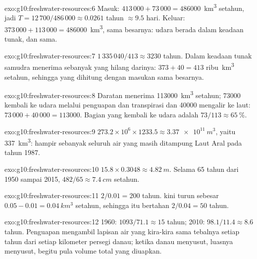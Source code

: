 \begin{solution}{exo:g10:freshwater-resources:6}
Masuk: $413\,000 + 73\,000 = \num{486000}$~\unit{km^3} setahun, jadi
$T = 12\,700/486\,000 \approx \num{0.0261}$ tahun $\approx \num{9.5}$ hari.
Keluar: $373\,000 + 113\,000 = \num{486000}$~\unit{km^3}, sama besarnya: udara
berada dalam keadaan tunak, dan  sama.
\end{solution}

\begin{solution}{exo:g10:freshwater-resources:7}
$1\,335\,040/413 \approx \num{3230}$ tahun. Dalam keadaan tunak samudra
menerima sebanyak yang hilang darinya: $373 + 40 = 413$ ribu~\unit{km^3}
setahun, sehingga  yang dihitung dengan masukan sama besarnya.
\end{solution}

\begin{solution}{exo:g10:freshwater-resources:8}
Daratan menerima \num{113000}~\unit{km^3} setahun; \num{73000} kembali ke
udara melalui penguapan dan transpirasi dan \num{40000} mengalir ke laut:
$73\,000 + 40\,000 = \num{113000}$. Bagian yang kembali ke udara adalah
$73/113 \approx \qty{65}{\percent}$.
\end{solution}

\begin{solution}{exo:g10:freshwater-resources:9}
$273.2 \times 10^6 \times 1233.5 \approx \qty{3.37e11}{m^3}$, yaitu
\qty{337}{km^3}: hampir sebanyak seluruh air yang masih ditampung Laut Aral
pada tahun 1987.
\end{solution}

\begin{solution}{exo:g10:freshwater-resources:10}
$15.8 \times 0.3048 \approx \qty{4.82}{m}$. Selama 65 tahun dari 1950 sampai
2015, $482/65 \approx \qty{7.4}{cm}$ setahun.
\end{solution}

\begin{solution}{exo:g10:freshwater-resources:11}
$2/0.01 = 200$ tahun.  kini turun sebesar $0.05 - 0.01 =
\qty{0.04}{km^3}$ setahun, sehingga  itu bertahan $2/0.04 = 50$ tahun.
\end{solution}

\begin{solution}{exo:g10:freshwater-resources:12}
1960: $1093/71.1 \approx 15$ tahun; 2010: $98.1/11.4 \approx 8.6$ tahun.
Penguapan mengambil lapisan air yang kira-kira sama tebalnya setiap tahun dari
setiap kilometer persegi danau; ketika danau menyusut, luasnya menyusut,
begitu pula volume total yang diuapkan.
\end{solution}

